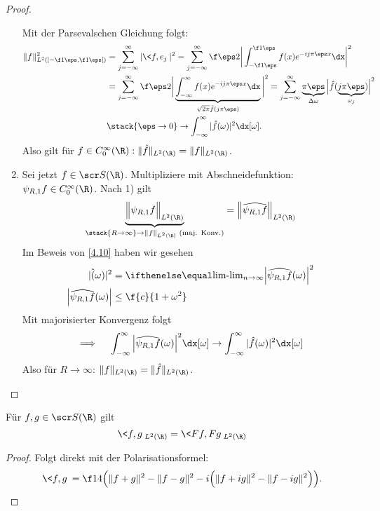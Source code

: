 \begin{st}
\begin{proof}
\begin{enumerate}[1)]
				Mit der Parsevalschen Gleichung folgt:
				\begin{align*}
					\|f\|_{L^2(]-\f 1\eps, \f 1\eps[)}^2 
					&= \sum_{j=-\infty}^\infty |\<f,e_j\>|^2 
					= \sum_{j=-\infty}^\infty \f \eps 2 \bigg| \int_{-\f 1\eps}^{\f 1\eps} f(x) e^{-ij\pi \eps x} \dx \bigg|^2 \\
					&= \sum_{j=-\infty}^\infty \f \eps 2 \bigg| \underbrace{\int_{-\infty}^{\infty} f(x) e^{-ij\pi \eps x} \dx}_{\sqrt{2\pi} \hat f (j\pi \eps)} \bigg|^2 
					= \sum_{j=-\infty}^\infty \underbrace{\pi \eps}_{\Delta \omega} \Big| \hat f(\underbrace{j\pi \eps}_{\omega_j})\Big|^2 \\
					&\stack{\eps \to 0}\to \int_{-\infty}^\infty |\hat f(\omega)|^2 \dx[\omega].
				\end{align*}
				Also gilt für $f \in C_0^\infty(\R) : \|\hat f\|_{L^2(\R)} = \|f\|_{L^2(\R)}$.
			\item
				Sei jetzt $f \in \scr S(\R)$.
				Multipliziere mit Abschneidefunktion: $\psi_{R,1} f \in C_0^\infty(\R)$.
				Nach 1) gilt
				\[
					\underbrace{\Big\|\psi_{R,1} f\Big\|_{L^2(\R)}}_{\stack{R\to \infty}\to \|f\|_{L^2(\R)} \text{ (maj. Konv.)}} = \Big\| \widehat{\psi_{R,1} f} \Big\|_{L^2(\R)}
				\]
				Im Beweis von \ref{4.10} haben wir gesehen
				\begin{align*}
					|\hat(\omega)|^2 &= \lim_{n\to\infty}\Big| \widehat{\psi_{R,1}f}(\omega) \Big|^2 \\
					\Big| \widehat{\psi_{R,1} f}(\omega) \Big| &\le \f {c}{1+\omega^2}
				\end{align*}
				Mit majorisierter Konvergenz folgt
				\[
					\implies \quad \int_{-\infty}^\infty \Big| \widehat{\psi_{R,1}f}(\omega)\Big|^2 \dx[\omega] \to \int_{-\infty}^\infty |\hat f(\omega)|^2 \dx[\omega]
				\]
				Also für $R \to \infty$: $\|f\|_{L^2(\R)} = \|\hat f\|_{L^2(\R)}$.
		\end{enumerate}
	\end{proof}
\end{st}

\begin{kor} \label{4.16}
	Für $f,g \in \scr S(\R)$ gilt
	\[
		\<f,g\>_{L^2(\R)} = \< Ff, Fg\>_{L^2(\R)}
	\]
	\begin{proof}
		Folgt direkt mit der Polarisationsformel:
		\[
			\<f,g\> = \f 14 \Big( \|f+g\|^2 - \|f-g\|^2 - i \Big(\|f+ig\|^2 - \|f-ig\|^2 \Big) \Big).
		\]
	\end{proof}
\end{kor}

